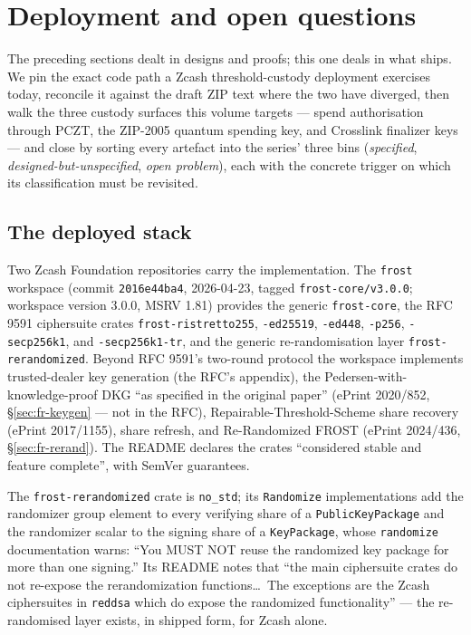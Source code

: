 \documentclass[11pt,a4paper]{article}
\theoremstyle{definition}
\begin{document}
\section{Deployment and open questions}\label{sec:fr-deploy}

The preceding sections dealt in designs and proofs; this one deals in what
ships. We pin the exact code path a Zcash threshold-custody deployment
exercises today, reconcile it against the draft ZIP text where the two have
diverged, then walk the three custody surfaces this volume targets ---
spend authorisation through PCZT, the ZIP-2005 quantum spending key, and
Crosslink finalizer keys --- and close by sorting every artefact into the
series' three bins (\emph{specified}, \emph{designed-but-unspecified},
\emph{open problem}), each with the concrete trigger on which its
classification must be revisited.

\subsection{The deployed stack}\label{sec:fr-deploy-stack}

Two Zcash Foundation repositories carry the implementation. The
\texttt{frost} workspace (commit \texttt{2016e44ba4}, 2026-04-23, tagged
\texttt{frost-core/v3.0.0}; workspace version 3.0.0, MSRV 1.81) provides
the generic \texttt{frost-core}, the RFC 9591 ciphersuite crates
\texttt{frost-ristretto255}, \texttt{-ed25519}, \texttt{-ed448},
\texttt{-p256}, \texttt{-secp256k1}, and \texttt{-secp256k1-tr}, and the
generic re-randomisation layer \texttt{frost-rerandomized}. Beyond
RFC 9591's two-round protocol the workspace implements trusted-dealer key
generation (the RFC's appendix), the Pedersen-with-knowledge-proof DKG ``as
specified in the original paper'' (ePrint 2020/852,
\S\ref{sec:fr-keygen} --- not in the RFC), Repairable-Threshold-Scheme
share recovery (ePrint 2017/1155), share refresh, and Re-Randomized FROST
(ePrint 2024/436, \S\ref{sec:fr-rerand}). The README declares the crates
``considered stable and feature complete'', with SemVer guarantees.

The \texttt{frost-rerandomized} crate is \texttt{no\_std}; its
\texttt{Randomize} implementations add the randomizer group element to
every verifying share of a \texttt{PublicKeyPackage} and the randomizer
scalar to the signing share of a \texttt{KeyPackage}, whose
\texttt{randomize} documentation warns: ``You MUST NOT reuse the
randomized key package for more than one signing.'' Its README notes that
``the main ciphersuite crates do not re-expose the rerandomization
functions\dots\ The exceptions are the Zcash ciphersuites in
\texttt{reddsa} which do expose the randomized functionality'' --- the
re-randomised layer exists, in shipped form, for Zcash alone.
\end{document}

